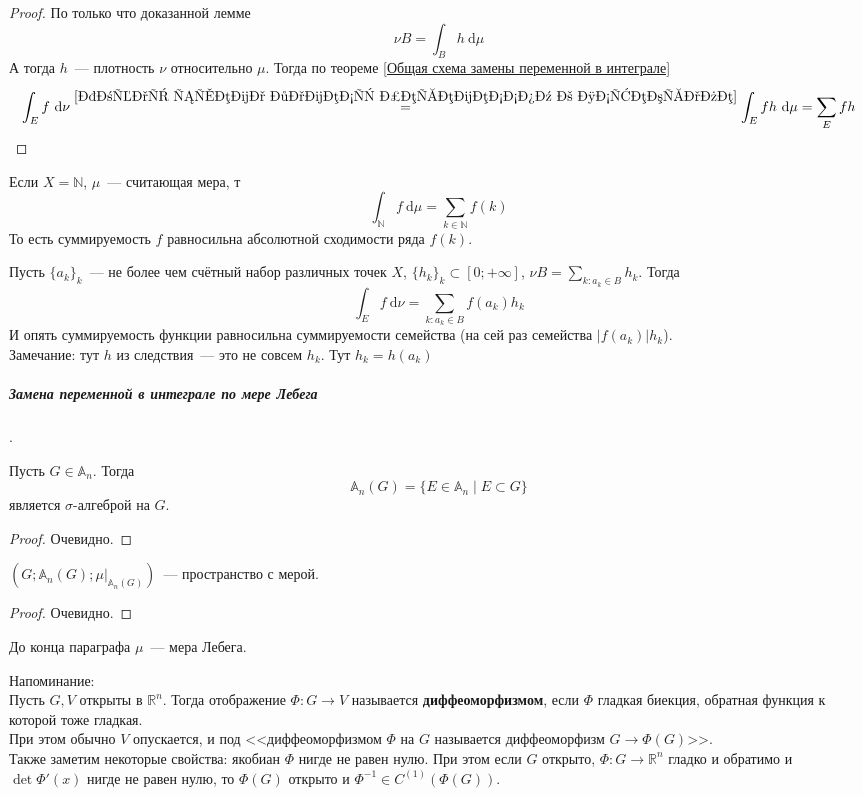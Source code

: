 \documentclass{article}
\begin{document}
    \begin{proof}
        По только что доказанной лемме
        $$
        \nu B=\int_Bh~\mathrm d\mu
        $$
        А тогда $h$~--- плотность $\nu$ относительно $\mu$. Тогда по теореме \ref{Общая схема замены переменной в интеграле}
        $$
        \int_Ef~\mathrm d\nu\overset{\ref{Общая схема замены переменной в интеграле}}=\int_Efh~\mathrm d\mu=\sum\limits_Efh
        $$
    \end{proof}
    \begin{example}
        Если $X=\mathbb N$, $\mu$~--- считающая мера, т
        $$
        \int_{\mathbb N}f~\mathrm d\mu=\sum\limits_{k\in\mathbb N}f(k)
        $$
        То есть суммируемость $f$ равносильна абсолютной сходимости ряда $f(k)$.
    \end{example}
    \begin{example}
        Пусть $\{a_k\}_k$~--- не более чем счётный набор различных точек $X$, $\{h_k\}_k\subset[0;+\infty]$, $\nu B=\sum\limits_{k:a_k\in B}h_k$. Тогда
        $$
        \int_Ef~\mathrm d\nu=\sum\limits_{k:a_k\in B}f(a_k)h_k
        $$
        И опять суммируемость функции равносильна суммируемости семейства (на сей раз семейства $|f(a_k)|h_k$).\\
        Замечание: тут $h$ из следствия~--- это не совсем $h_k$. Тут $h_k=h(a_k)$
    \end{example}
    \subparagraph{Замена переменной в интеграле по мере Лебега}.
    \begin{claim}
        Пусть $G\in\mathbb A_n$. Тогда
        $$\mathbb A_n(G)=\{E\in\mathbb A_n\mid E\subset G\}$$
        является $\sigma$-алгеброй на $G$.
    \end{claim}
    \begin{proof}
        Очевидно.
    \end{proof}
    \begin{claim}
        $(G;\mathbb A_n(G);\mu\big|_{\mathbb A_n(G)})$~--- пространство с мерой.
    \end{claim}
    \begin{proof}
        Очевидно.
    \end{proof}
    \begin{remark}
        До конца параграфа $\mu$~--- мера Лебега.
    \end{remark}
    \begin{remark}
        Напоминание:\\
        Пусть $G,V$ открыты в $\mathbb R^n$. Тогда отображение $\Phi\colon G\to V$ называется \textbf{диффеоморфизмом}, если $\Phi$ гладкая биекция, обратная функция к которой тоже гладкая.\\
        При этом обычно $V$ опускается, и под <<диффеоморфизмом $\Phi$ на $G$ называется диффеоморфизм $G\to\Phi(G)$>>.\\
        Также заметим некоторые свойства: якобиан $\Phi$ нигде не равен нулю. При этом если $G$ открыто, $\Phi\colon G\to\mathbb R^n$ гладко и обратимо и $\det\Phi'(x)$ нигде не равен нулю, то $\Phi(G)$ открыто и $\Phi^{-1}\in C^{(1)}(\Phi(G))$.
    \end{remark}
\end{document}
